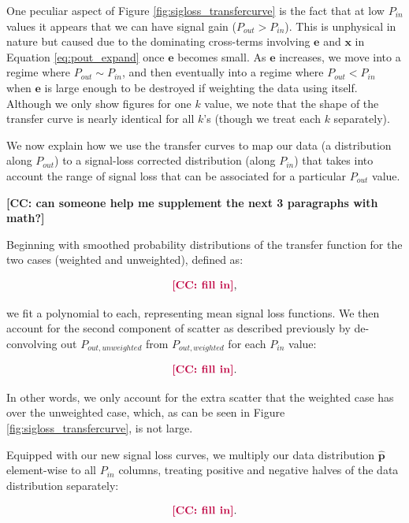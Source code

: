 \documentclass[preprint2,numberedappendix,tighten]{aastex6}  %
\newcommand{\cc}[1]{{\color{purple} \textbf{[CC: #1]}}}
\begin{document}
One peculiar aspect of Figure \ref{fig:sigloss_transfercurve} is the fact that at low $P_{in}$ values it appears that we can have signal gain ($P_{out} > P_{in}$). This is unphysical in nature but caused due to the dominating cross-terms involving $\textbf{e}$ and $\textbf{x}$ in Equation \eqref{eq:pout_expand} once $\textbf{e}$ becomes small. As $\textbf{e}$ increases, we move into a regime where $P_{out} \sim P_{in}$, and then eventually into a regime where $P_{out} < P_{in}$ when $\textbf{e}$ is large enough to be destroyed if weighting the data using itself. Although we only show figures for one $k$ value, we note that the shape of the transfer curve is nearly identical for all $k$'s (though we treat each $k$ separately).

We now explain how we use the transfer curves to map our data (a distribution along $P_{out}$) to a signal-loss corrected distribution (along $P_{in}$) that takes into account the range of signal loss that can be associated for a particular $P_{out}$ value.

\cc{can someone help me supplement the next 3 paragraphs with math?}

Beginning with smoothed probability distributions of the transfer function for the two cases (weighted and unweighted), defined as:

\begin{equation}
\cc{fill in},
\end{equation}

\noindent we fit a polynomial to each, representing mean signal loss functions. We then account for the second component of scatter as described previously by de-convolving out $P_{out, unweighted}$ from $P_{out, weighted}$ for each $P_{in}$ value:

\begin{equation}
\cc{fill in}.
\end{equation}

In other words, we only account for the extra scatter that the weighted case has over the unweighted case, which, as can be seen in Figure \ref{fig:sigloss_transfercurve}, is not large.

Equipped with our new signal loss curves, we multiply our data distribution $\hat{\textbf{p}}$ element-wise to all $P_{in}$ columns, treating positive and negative halves of the data distribution separately:

\begin{equation}
\cc{fill in}.
\end{equation}
\end{document}
